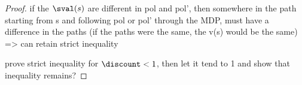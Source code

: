 \begin{proof}
    if the $\sval(s)$ are different in pol and pol', then somewhere in the path starting from s and following pol or pol' through the MDP, must have a difference in the paths (if the paths were the same, the v(s) would be the same)
    => can retain strict inequality

    prove strict inequality for $\discount < 1$, then let it tend to 1 and show that inequality remains?
\end{proof}